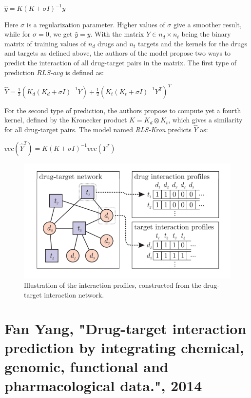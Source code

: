 \begin{center}
$\hat{y} = K(K+\sigma I)^{-1}y$
\end{center}
Here $\sigma$ is a regularization parameter. Higher values of $\sigma$ give a smoother result, while for $\sigma=0$, we get $\hat{y}=y$.
With the matrix $Y\in n_d \times n_t$ being the binary matrix of training values of $n_d$ drugs and $n_t$ targets and the kernels for the drugs and targets as defined above, the authors of the model propose two ways to predict the interaction of all drug-target pairs in the matrix. The first type of prediction $RLS$-$avg$ is defined as:
\begin{center}
$\hat{Y}=\frac{1}{2}(K_d(K_d+\sigma I)^{-1}Y)+\frac{1}{2}(K_t(K_t+\sigma I)^{-1}Y^T)^T$
\end{center}
For the second type of prediction, the authors propose to compute yet a fourth kernel, defined by the Kronecker product $K = K_d \otimes K_t$, which gives a similarity for all drug-target pairs. The model named \textit{RLS-Kron} predicts $\hat{Y}$ as:
\begin{center}
$vec(\hat{Y}^T) = K(K+\sigma I)^{-1}vec(Y^T)$
\end{center}


\begin{figure}
\begin{center}
\includegraphics[scale=0.65]{laarhoven_related.png}
\end{center}
\caption[Illustration of Gaussian Interaction Profile Kernel Method]{\large{Illustration of the interaction profiles, constructed from the drug-target interaction network.}}
\label{fig:laarhoven_1}
\end{figure}

\section{Fan Yang, "Drug-target interaction prediction by integrating chemical, genomic, functional and pharmacological data.", 2014}

